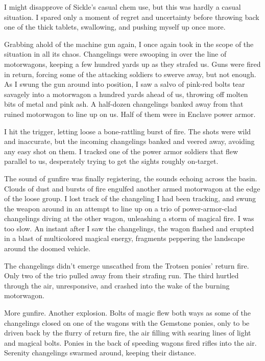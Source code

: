 I might disapprove of Sickle’s casual chem use, but this was hardly a casual situation. I spared only a moment of regret and uncertainty before throwing back one of the thick tablets, swallowing, and pushing myself up once more.

Grabbing ahold of the machine gun again, I once again took in the scope of the situation in all its chaos. Changelings were swooping in over the line of motorwagons, keeping a few hundred yards up as they strafed us. Guns were fired in return, forcing some of the attacking soldiers to swerve away, but not enough. As I swung the gun around into position, I saw a salvo of pink-red bolts tear savagely into a motorwagon a hundred yards ahead of us, throwing off molten bits of metal and pink ash. A half-dozen changelings banked away from that ruined motorwagon to line up on us. Half of them were in Enclave power armor.

I hit the trigger, letting loose a bone-rattling burst of fire. The shots were wild and inaccurate, but the incoming changelings banked and veered away, avoiding any easy shot on them. I tracked one of the power armor soldiers that flew parallel to us, desperately trying to get the sights roughly on-target.

The sound of gunfire was finally registering, the sounds echoing across the basin. Clouds of dust and bursts of fire engulfed another armed motorwagon at the edge of the loose group. I lost track of the changeling I had been tracking, and swung the weapon around in an attempt to line up on a trio of power-armor-clad changelings diving at the other wagon, unleashing a storm of magical fire. I was too slow. An instant after I saw the changelings, the wagon flashed and erupted in a blast of multicolored magical energy, fragments peppering the landscape around the doomed vehicle.

The changelings didn’t emerge unscathed from the Trotsen ponies’ return fire. Only two of the trio pulled away from their strafing run. The third hurtled through the air, unresponsive, and crashed into the wake of the burning motorwagon.

More gunfire. Another explosion. Bolts of magic flew both ways as some of the changelings closed on one of the wagons with the Gemstone ponies, only to be driven back by the flurry of return fire, the air filling with searing lines of light and magical bolts. Ponies in the back of speeding wagons fired rifles into the air. Serenity changelings swarmed around, keeping their distance.

